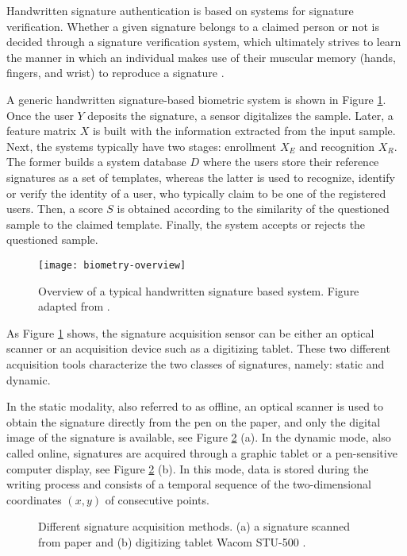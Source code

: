 Handwritten signature authentication is based on systems for signature verification. 
Whether a given signature belongs to a claimed person or not is decided through a signature verification system, which ultimately strives to learn the manner in which
an individual makes use of their muscular memory (hands,
fingers, and wrist) to reproduce a signature \cite{gupta1997review}. 

A generic handwritten signature-based biometric system is shown in Figure \ref{fig_ahsv-overview}. Once the user {\boldm $Y$} deposits the signature, a sensor digitalizes the sample. Later, a feature matrix {\boldm $X$} is built with the information extracted from the input sample. Next, the systems typically have two stages: enrollment {\boldm $X_{E}$} and recognition {\boldm $X_{R}$}. The former builds a system database {\boldm $D$} where the users store their reference signatures as a set of templates, whereas the latter is
used to recognize, identify or verify the identity of a user, who typically claim to be one of the registered users. Then, a score {\boldm $S$} is obtained according to the similarity of the
questioned sample to the claimed template. Finally, the system accepts or rejects the questioned sample.

\begin{figure}[!htb]
\centering
\texttt{[image: biometry-overview]}
\caption{Overview of a typical handwritten signature based system. Figure adapted from \cite{jain2016}.}
\label{fig_ahsv-overview}
\end{figure}

As Figure \ref{fig_ahsv-overview} shows, the signature acquisition sensor can be either an optical scanner or an acquisition device such as a digitizing tablet. These two different acquisition tools characterize the two classes of signatures, namely: static and dynamic. 

In the static modality, also referred to as offline, an optical scanner is used to obtain the signature directly from the pen on the paper, and only the digital image of the signature is available, see Figure \ref{fig:acquisition} (a). In the dynamic mode, also called online, signatures are acquired through a graphic tablet or a pen-sensitive computer display, see Figure \ref{fig:acquisition} (b). In this mode, data is stored during the writing process and consists of a temporal sequence of the two-dimensional coordinates $(x, y)$ of consecutive points. 

\begin{figure}[!htpb]
\centering
\hspace*{0.5in} %
\caption{Different signature acquisition methods. (a) a signature scanned from paper and (b) digitizing tablet Wacom STU-500 \cite{wacom2016}. } \label{fig:acquisition}
\end{figure}


